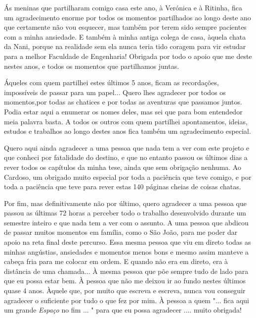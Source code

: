 Ás meninas que partilharam comigo casa este ano, à Verónica e à Ritinha, fica um agradecimento enorme por todos os momentos partilhados ao longo deste ano que certamente não vou esquecer, mas também por terem sido sempre pacientes com a minha ansiedade. E também à minha antiga colega de casa, àquela chata da Nani, porque na realidade sem ela nunca teria tido coragem para vir estudar para a melhor Faculdade de Engenharia! Obrigada por todo o apoio que me deste nestes anos, e todos os momentos que partilhamos juntas.

Áqueles com quem partilhei estes últimos 5 anos, ficam as recordações, impossíveis de passar para um papel... Quero lhes agradecer por todos os momentos,por todas as chatices e por todas as aventuras que passamos juntos. Podia estar aqui a enumerar os nomes deles, mas sei que para bom entendedor meia palavra basta. A todos os outros com quem partilhei apontamentos, ideias, estudos e trabalhos ao longo destes anos fica também um agradecimento especial.

Quero aqui ainda agradecer a uma pessoa que nada tem a ver com este projeto e que conheci por fatalidade do destino, e que no entanto passou os últimos dias a rever todos os capítulos da minha tese, ainda que sem obrigação nenhuma. Ao Cardoso, um obrigado muito especial por toda a paciência que teve comigo, e por toda a paciência que teve para rever estas 140 páginas cheias de coisas chatas.


Por fim, mas definitivamente não por último, quero agradecer a uma pessoa que passou as últimas 72 horas a perceber todo o trabalho desenvolvido durante um semestre inteiro e que nada tem a ver com o assunto. A uma pessoa que abdicou de passar muitos momentos em família, como o São João, para me poder dar apoio na reta final deste percurso. Essa mesma pessoa que viu em direto todas as minhas angústias, ansiedades e momentos menos bons e mesmo assim manteve a cabeça fria para me colocar em ordem. E quando não era em direto, era à distância de uma chamada... À mesma pessoa que põe sempre tudo de lado para que eu possa estar bem. À pessoa que não me deixou ir ao fundo nestes últimos quase 4 anos. Àquele que, por muito que escreva e escreva, nunca vou conseguir agradecer o suficiente por tudo o que fez por mim.  À pessoa a quem "... fica aqui um grande \textit{Espaço} no fim ... " para que eu possa agradecer .... muito obrigada!





\vspace{10mm}
